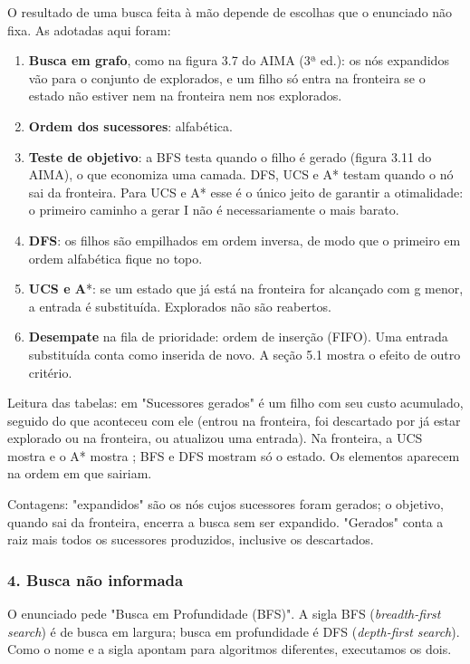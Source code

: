 \documentclass[12pt, a4paper]{article}
\providecommand{\tightlist}{%
  \setlength{\itemsep}{0pt}\setlength{\parskip}{0pt}}
\DeclareRobustCommand{\texttt}[1]{\breakabletexttt{#1}}
\begin{document}
O resultado de uma busca feita à mão depende de escolhas que o enunciado não fixa. As adotadas aqui foram:

\begin{enumerate}
\def\labelenumi{\arabic{enumi}.}
\tightlist
\item
  \textbf{Busca em grafo}, como na figura 3.7 do AIMA (3ª ed.): os nós expandidos vão para o conjunto de explorados, e um filho só entra na fronteira se o estado não estiver nem na fronteira nem nos explorados.
\item
  \textbf{Ordem dos sucessores}: alfabética.
\item
  \textbf{Teste de objetivo}: a BFS testa quando o filho é gerado (figura 3.11 do AIMA), o que economiza uma camada. DFS, UCS e A* testam quando o nó sai da fronteira. Para UCS e A* esse é o único jeito de garantir a otimalidade: o primeiro caminho a gerar I não é necessariamente o mais barato.
\item
  \textbf{DFS}: os filhos são empilhados em ordem inversa, de modo que o primeiro em ordem alfabética fique no topo.
\item
  \textbf{UCS e A}*: se um estado que já está na fronteira for alcançado com g menor, a entrada é substituída. Explorados não são reabertos.
\item
  \textbf{Desempate} na fila de prioridade: ordem de inserção (FIFO). Uma entrada substituída conta como inserida de novo. A seção 5.1 mostra o efeito de outro critério.
\end{enumerate}

Leitura das tabelas: \texttt{X{[}g{]}} em "Sucessores gerados" é um filho com seu custo acumulado, seguido do que aconteceu com ele (entrou na fronteira, foi descartado por já estar explorado ou na fronteira, ou atualizou uma entrada). Na fronteira, a UCS mostra \texttt{X(g)} e o A* mostra \texttt{X(f)}; BFS e DFS mostram só o estado. Os elementos aparecem na ordem em que sairiam.

Contagens: "expandidos" são os nós cujos sucessores foram gerados; o objetivo, quando sai da fronteira, encerra a busca sem ser expandido. "Gerados" conta a raiz mais todos os sucessores produzidos, inclusive os descartados.

\subsubsection{4. Busca não informada}\label{4-busca-nuxe3o-informada}

O enunciado pede "Busca em Profundidade (BFS)". A sigla BFS (\emph{breadth-first search}) é de busca em largura; busca em profundidade é DFS (\emph{depth-first search}). Como o nome e a sigla apontam para algoritmos diferentes, executamos os dois.
\end{document}
